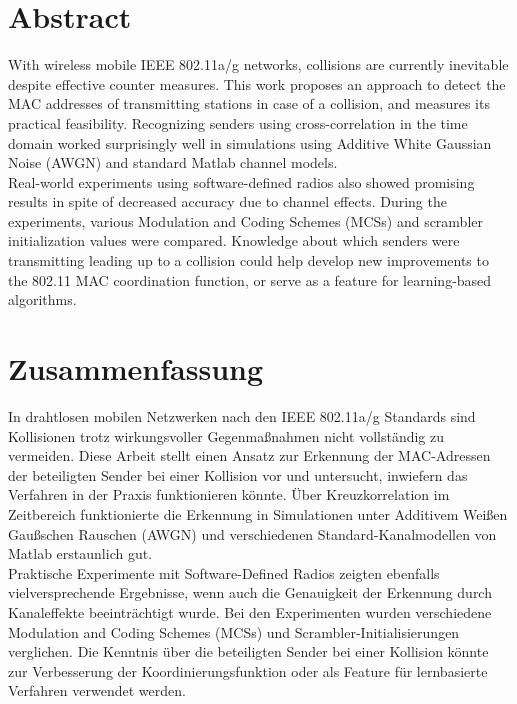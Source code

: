 

\begingroup
\let\clearpage\relax
\let\cleardoublepage\relax
\let\cleardoublepage\relax

\chapter*{Abstract}

With wireless mobile IEEE 802.11a/g networks, collisions are currently inevitable despite effective counter measures. This work proposes an approach to detect the MAC addresses of transmitting stations in case of a collision, and measures its practical feasibility. Recognizing senders using cross-correlation in the time domain worked surprisingly well in simulations using Additive White Gaussian Noise (AWGN) and standard Matlab channel models.\\

Real-world experiments using software-defined radios also showed promising results in spite of decreased accuracy due to channel effects. During the experiments, various Modulation and Coding Schemes (MCSs) and scrambler initialization values were compared. Knowledge about which senders were transmitting leading up to a collision could help develop new improvements to the 802.11 MAC coordination function, or serve as a feature for learning-based algorithms.



\vfill
{}
\chapter*{Zusammenfassung}

In drahtlosen mobilen Netzwerken nach den IEEE 802.11a/g Standards sind Kollisionen trotz wirkungsvoller Gegenmaßnahmen nicht vollständig zu vermeiden. Diese Arbeit stellt einen Ansatz zur Erkennung der MAC-Adressen der beteiligten Sender bei einer Kollision vor und untersucht, inwiefern das Verfahren in der Praxis funktionieren könnte. Über Kreuzkorrelation im Zeitbereich funktionierte die Erkennung in Simulationen unter Additivem Weißen Gaußschen Rauschen (AWGN) und verschiedenen Standard-Kanalmodellen von Matlab erstaunlich gut.\\

Praktische Experimente mit Software-Defined Radios zeigten ebenfalls vielversprechende Ergebnisse, wenn auch die Genauigkeit der Erkennung durch Kanaleffekte beeinträchtigt wurde. Bei den Experimenten wurden verschiedene Modulation and Coding Schemes (MCSs) und Scrambler-Initialisierungen verglichen. Die Kenntnis über die beteiligten Sender bei einer Kollision könnte zur Verbesserung der Koordinierungsfunktion oder als Feature für lernbasierte Verfahren verwendet werden.


\endgroup
\vfill
